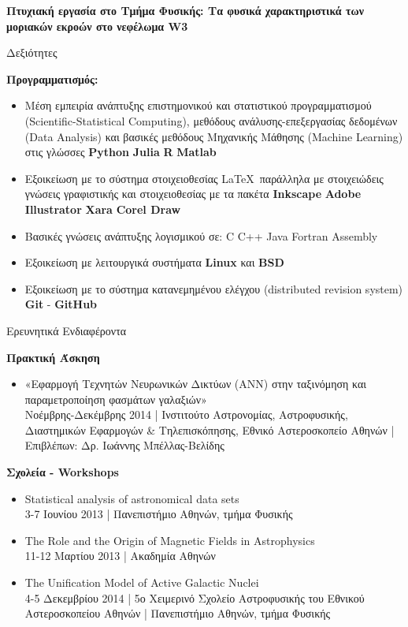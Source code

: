 \documentclass[a4paper,12pt,final]{memoir}
\newcommand{\SmallSep}{\vspace{0.25em}}
\newcommand{\CVSection}[1]
	{\Large{#1}\par
	\SmallSep\normalsize\normalfont}
\newcommand{\CVItem}[2]
	{\textbf{\color{RoyalBlue} #1} #2}
\newcommand{\location}[1]{ %
\small{\color{headings}#1}}
\newenvironment{tightitemize} %
{\vspace{-\topsep}\begin{itemize}\itemsep1pt \parskip0pt \parsep0pt}
{\end{itemize}\vspace{-\topsep}}
\begin{document}
\CVItem{Πτυχιακή εργασία στο Τμήμα Φυσικής: Τα φυσικά χαρακτηριστικά των μοριακών εκροών στο νεφέλωμα W3 \newline}
\location{}
\SmallSep


\CVSection{Δεξιότητες}
\CVItem{Προγραμματισμός:}{}
\begin{tightitemize}
\item Μέση εμπειρία ανάπτυξης επιστημονικού και στατιστικού προγραμματισμού (Scientific-Statistical Computing), μεθόδους ανάλυσης-επεξεργασίας δεδομένων (Data Analysis) και βασικές μεθόδους Μηχανικής Μάθησης (Machine Learning) στις γλώσσες \textbf{Python}  \textbullet{} \textbf{Julia} \textbullet{} \textbf{R} \textbullet{} \textbf{Matlab}
\item Εξοικείωση με το σύστημα στοιχειοθεσίας \LaTeX\ παράλληλα με στοιχειώδεις γνώσεις γραφιστικής και στοιχειοθεσίας με τα πακέτα \textbf{Inkscape} \textbullet{} \textbf{Adobe Illustrator} \textbullet{} \textbf{Xara} \textbullet{} \textbf{Corel Draw}
\item Βασικές γνώσεις ανάπτυξης λογισμικού σε: C \textbullet{} C++ \textbullet{} Java \textbullet{} Fortran \textbullet{} Assembly 
\item Εξοικείωση με λειτουργικά συστήματα \textbf{Linux} και \textbf{BSD}
\item Εξοικείωση με το σύστημα κατανεμημένου ελέγχου (distributed revision system) \textbf{Git} - \textbf{GitHub}
\end{tightitemize}
\SmallSep

\CVSection{Ερευνητικά Ενδιαφέροντα}
\CVItem{Πρακτική Άσκηση}{}
\begin{tightitemize}
	\item «Εφαρμογή Τεχνητών Νευρωνικών Δικτύων (ANN) στην ταξινόμηση και παραμετροποίηση φασμάτων γαλαξιών» \\
	\location{Νοέμβρης-Δεκέμβρης 2014 | Ινστιτούτο Αστρονομίας, Αστροφυσικής, Διαστημικών Εφαρμογών \& Τηλεπισκόπησης, Εθνικό Αστεροσκοπείο Αθηνών | Επιβλέπων: Δρ. Ιωάννης Μπέλλας-Βελίδης}
\end{tightitemize}
\CVItem{Σχολεία - Workshops}{}
\begin{tightitemize}
\item Statistical analysis of astronomical data sets \\
\location{3-7 Ιουνίου 2013 | Πανεπιστήμιο Αθηνών, τμήμα Φυσικής}
\item The Role and the Origin of Magnetic Fields in Astrophysics \\
\location{11-12 Μαρτίου 2013 | Ακαδημία Αθηνών}
\item The Unification Model of Active Galactic Nuclei \\
\location{4-5 Δεκεμβρίου 2014 | 5ο Χειμερινό Σχολείο Αστροφυσικής του Εθνικού Αστεροσκοπείου Αθηνών | Πανεπιστήμιο Αθηνών, τμήμα Φυσικής}
\end{tightitemize}
\SmallSep
\end{document}
